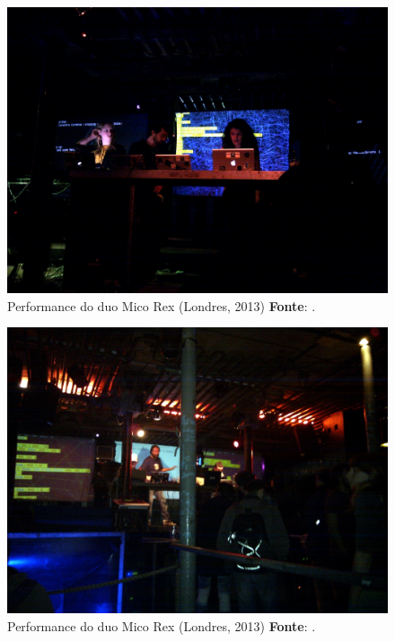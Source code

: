 \begin{figure}[h]
  \centering
  \includegraphics[scale=0.3]{imagens/cardenas.jpg}
  \caption{Performance do duo Mico Rex (Londres, 2013) \textbf{Fonte}: .}
  \label{fig:cardenas}
\end{figure}

\begin{figure}[!h]
  \centering
  \includegraphics[scale=0.3]{imagens/algorave.jpg}
  \caption{Performance do duo Mico Rex (Londres, 2013) \textbf{Fonte}: .}
  \label{fig:micorex}
\end{figure}

